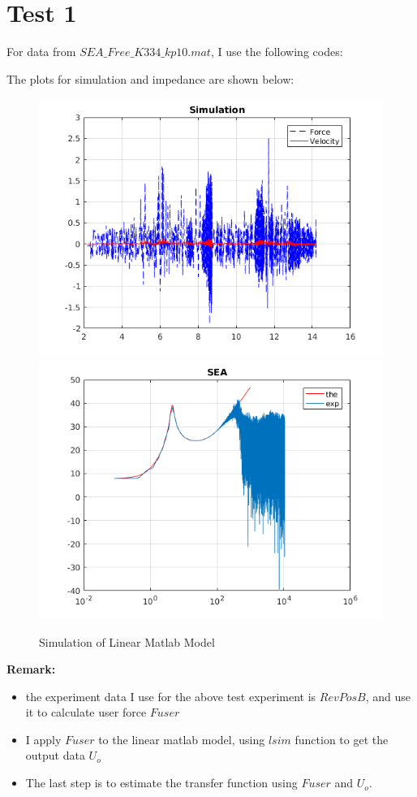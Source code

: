 \documentclass[letterpaper]{article}
\begin{document}
\section*{Test 1}
For data from $SEA\_Free\_K334\_kp10.mat$, I use the following codes:

The plots for simulation and impedance are shown below:
\begin{figure}[H]
	\centering
	\includegraphics[scale=0.5]{SEA_Free_K334_kp10_sim.png}
	\includegraphics[scale=0.5]{SEA_Free_K334_kp10_impedance.png}
	\caption{Simulation of Linear Matlab Model}
	\label{fig:sim}
\end{figure}

\vspace*{1em}
\textbf{Remark:}
\begin{itemize}
	\item the experiment data I use for the above test experiment is $RevPosB$, and use it to calculate user force $Fuser$
	\item I apply $Fuser$ to the linear matlab model, using $lsim$ function to get the output data $U_o$
	\item The last step is to estimate the transfer function using $Fuser$ and $U_o$.
\end{itemize}
\end{document}

